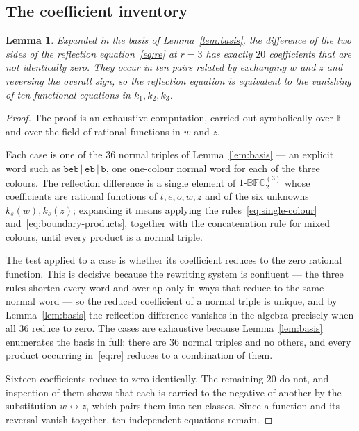 \documentclass[
  aps,pre,
  reprint,
  superscriptaddress,
  amsmath,amssymb,
  floatfix
]{revtex4-2}
\theoremstyle{plain}
\newtheorem{lemma}[theorem]{Lemma}
\theoremstyle{definition}
\theoremstyle{remark}
\newcommand{\BFCthree}{1\text{-}\mathbb{BFC}^{(3)}_2}
\newcommand{\Fld}{\mathbb{F}}
\begin{document}
\subsection{The coefficient inventory}

\begin{lemma}
\label{lem:inventory}
Expanded in the basis of Lemma~\ref{lem:basis}, the difference of the two sides
of the reflection equation~\eqref{eq:re} at $r=3$ has exactly $20$ coefficients
that are not identically zero. They occur in ten pairs related by exchanging
$w$ and $z$ and reversing the overall sign, so the reflection equation is
equivalent to the vanishing of ten functional equations in $k_1,k_2,k_3$.
\end{lemma}

\begin{proof}
The proof is an exhaustive computation, carried out symbolically over $\Fld$
and over the field of rational functions in $w$ and $z$.

Each case is one of the $36$ normal triples of Lemma~\ref{lem:basis} --- an
explicit word such as $\mathtt{beb}\,|\,\mathtt{eb}\,|\,\mathtt{b}$, one
one-colour normal word for each of the three colours. The reflection difference
is a single element of $\BFCthree$ whose coefficients are rational functions of
$t,e,o,w,z$ and of the six unknowns $k_s(w),k_s(z)$; expanding it means
applying the rules~\eqref{eq:single-colour} and~\eqref{eq:boundary-products},
together with the concatenation rule for mixed colours, until every product is
a normal triple.

The test applied to a case is whether its coefficient reduces to the zero
rational function. This is decisive because the rewriting system is confluent
--- the three rules shorten every word and overlap only in ways that reduce to
the same normal word --- so the reduced coefficient of a normal triple is
unique, and by Lemma~\ref{lem:basis} the reflection difference vanishes in the
algebra precisely when all $36$ reduce to zero. The cases are exhaustive
because Lemma~\ref{lem:basis} enumerates the basis in full: there are $36$
normal triples and no others, and every product occurring in~\eqref{eq:re}
reduces to a combination of them.

Sixteen coefficients reduce to zero identically. The remaining $20$ do not, and
inspection of them shows that each is carried to the negative of another by the
substitution $w\leftrightarrow z$, which pairs them into ten classes. Since a
function and its reversal vanish together, ten independent equations remain.
\end{proof}
\end{document}
